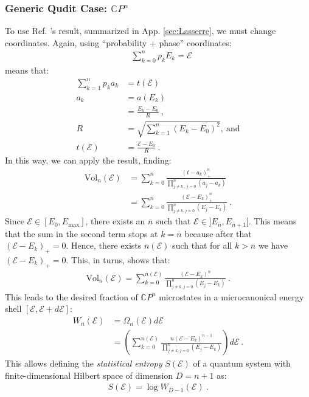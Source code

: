 \documentclass[draft,nofootinbib,pre,twocolumn,showpacs,showkeys,groupaddress,preprintnumbers,floatfix]{revtex4-1}
\newcommand{\1}{\mathbbm{1}}
\begin{document}
\subsubsection{Generic Qudit Case: $\mathbb{C}P^n$}

To use Ref. \cite{Lasserre2015}'s result, summarized in App. \ref{sec:Lasserre},
we must change coordinates. Again, using ``probability + phase'' coordinates:
\begin{align*}
& \sum_{k=0}^n p_k E_k = \mathcal{E}
\end{align*}
means that:
\begin{align*}
\sum_{k=1}^n p_k a_k & = t(\mathcal{E})  \\
  a_k & = a(E_k) \\
  & = \frac{E_k-E_0}{R} ~, \\
  R & = \sqrt{\sum_{k=1}^n \left( E_k - E_0\right)^2} ,~\text{and} \\
  t(\mathcal{E}) & = \frac{\mathcal{E}-E_0}{R}
  ~.
\end{align*}
In this way, we can apply the result, finding:
\begin{align*}
\mathrm{Vol}_n \left( \mathcal{E}\right)
  & = \sum_{k=0}^{n}
  \frac{(t-a_k)_{+}^{n}}{\prod_{j \neq k \,,\, j=0 }^n (a_j - a_k)} \\
  & =\sum_{k=0}^n
  \frac{(\mathcal{E}-E_k)_{+}^n}{\prod_{j \neq k, j=0}^n (E_j-E_k)}
  ~.
\end{align*}
Since $\mathcal{E} \in [E_0,E_{\mathrm{max}}]$, there exists an $\overline{n}$
such that $\mathcal{E} \in ]E_{\overline{n}},E_{\overline{n}+1}[$. This means
that the sum in the second term stops at $k=\overline{n}$ because after that
$(\mathcal{E}-E_k)_+ = 0$. Hence, there exists $\overline{n}(\mathcal{E})$ such
that for all $k > \overline{n}$ we have $(\mathcal{E}-E_k)_+ = 0$. This, in
turns, shows that:
\begin{align*}
\mathrm{Vol}_n \left( \mathcal{E}\right)
  = \sum_{k=0}^{\overline{n}(\mathcal{E})}
 \frac{(\mathcal{E}-E_k)^n}{\prod_{j \neq k, j=0}^n (E_j-E_k)}
  ~.
\end{align*}
This leads to the desired fraction of $\mathbb{C}P^n$ microstates in a microcanonical energy shell $[\mathcal{E},\mathcal{E}+ d \mathcal{E}]$:
\begin{align*}
W_n(\mathcal{E})
 & = \Omega_n(\mathcal{E}) d \mathcal{E} \\
 & = \left(  \sum_{k=0}^{\overline{n}(\mathcal{E})}
 \frac{n(\mathcal{E}-E_k)^{n-1}}{\prod_{j \neq k, j=0}^n (E_j-E_k)}\right)
 d \mathcal{E} 
  ~.
\end{align*}
This allows defining the \emph{statistical entropy} $S(\mathcal{E})$ of a
quantum system with finite-dimensional Hilbert space of dimension $D=n+1$ as:
\begin{align*}
S(\mathcal{E}) = \log W_{D-1}(\mathcal{E}) 
  ~.
\end{align*}
\end{document}
